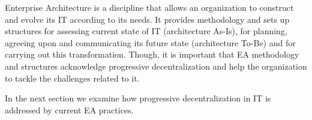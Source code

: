 
Enterprise Architecture is a discipline  that allows an organization to construct and evolve its IT according to its needs. It provides  methodology and sets up structures  for assessing current state of IT (architecture As-Is), for planning, agreeing upon and communicating its future state (architecture To-Be) and for carrying out this transformation. Though, it is important that  EA methodology and structures acknowledge progressive decentralization and help the organization to tackle the challenges related to it.

In the next section we examine how progressive decentralization in IT is addressed by current EA practices. 

